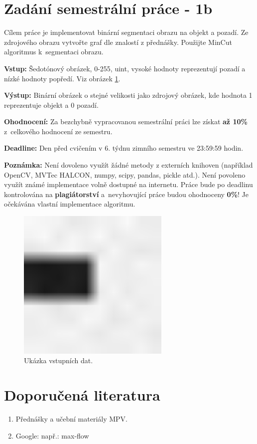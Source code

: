 \documentclass[12pt, a4paper]{article}
\newcommand{\cisloZadani}{Zadání semestrální práce - 1b}
\begin{document}
\section*{\cisloZadani}

\par{Cílem práce je implementovat binární segmentaci obrazu na objekt a pozadí. Ze zdrojového obrazu vytvořte graf dle znalostí z přednášky. Použijte MinCut algoritmus k~segmentaci obrazu.}

\par{\textbf{Vstup:} Šedotónový obrázek, 0-255, uint, vysoké hodnoty reprezentují pozadí a nízké hodnoty popředí. Viz obrázek \ref{fig:example}.}

\par{\textbf{Výstup:} Binární obrázek o stejné velikosti jako zdrojový obrázek, kde hodnota 1 reprezentuje objekt a 0 pozadí.}

\par{\textbf{Ohodnocení:} Za bezchybně vypracovanou semestrální práci lze získat \textbf{až 10\%} z~celkového hodnocení ze semestru.}

\par{\textbf{Deadline:} Den před cvičením v 6. týdnu zimního semestru ve 23:59:59 hodin.}

\par{\textbf{Poznámka:} Není dovoleno využít žádné metody z externích knihoven (například OpenCV, MVTec HALCON, numpy, scipy, pandas, pickle atd.). Není povoleno využít známé implementace volně dostupné na internetu. Práce bude po deadlinu kontrolována na \textbf{plagiátorství} a~nevyhovující práce budou ohodnoceny \textbf{0\%}! Je očekávána vlastní implementace algoritmu.}

\begin{figure}[!ht]
	\centering
	\includegraphics[width = 0.65\textwidth]{syntheticImg_1.jpg}
	\caption{Ukázka vstupních dat.}	
	\label{fig:example}
\end{figure}


\section*{Doporučená literatura}
\begin{enumerate}
	\item Přednášky a učební materiály MPV.
	\item Google: např.: max-flow
\end{enumerate}
\end{document}

